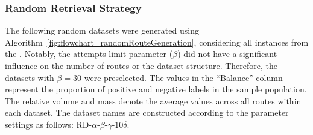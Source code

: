 \subsubsection{Random Retrieval Strategy}
The following random datasets were generated using Algorithm~\ref{fig:flowchart_randomRouteGeneration},
considering all instances from the \gendreauDataSetText. Notably, the attempts limit parameter ($\beta$) did not have a significant influence
on the number of routes or the dataset structure. Therefore, the datasets with $\beta = 30$ were preselected.
The values in the “Balance” column represent the proportion of positive and negative labels in the sample population.
The relative volume and mass denote the average values across all routes within each dataset. The dataset names are
constructed according to the parameter settings as follows: RD-$\alpha$-$\beta$-$\gamma$-$10\delta$.
